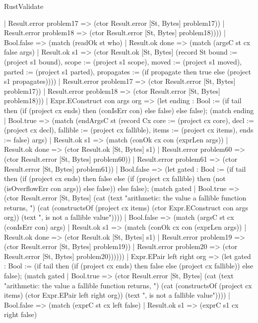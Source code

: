 \begin{lexlean}{RustValidate}
\begin{semanticmodule}
{            | Result.error problem17 => (ctor Result.error [St, Bytes] problem17))
          | Result.error problem18 => (ctor Result.error [St, Bytes] problem18))))
      | Bool.false => (match (readOk st who)
        | Result.ok done => (match (argsC st cx false args)
          | Result.ok s1 => (ctor Result.ok [St, Bytes] (record St {bound := (project s1 bound), scope := (project s1 scope), moved := (project s1 moved), parted := (project s1 parted), propagates := (if propagate then true else (project s1 propagates))}))
          | Result.error problem17 => (ctor Result.error [St, Bytes] problem17))
        | Result.error problem18 => (ctor Result.error [St, Bytes] problem18)))
    | Expr.EConstruct con args org => (let ending : Bool := (if tail then (if (project cx ends) then (conIsErr con) else false) else false); (match ending
      | Bool.true => (match (endArgsC st (record Cx {core := (project cx core), decl := (project cx decl), fallible := (project cx fallible), items := (project cx items), ends := false}) args)
        | Result.ok s1 => (match (conOk cx con (exprLen args))
          | Result.ok done => (ctor Result.ok [St, Bytes] s1)
          | Result.error problem60 => (ctor Result.error [St, Bytes] problem60))
        | Result.error problem61 => (ctor Result.error [St, Bytes] problem61))
      | Bool.false => (let gated : Bool := (if tail then (if (project cx ends) then false else (if (project cx fallible) then (not (isOverflowErr con args)) else false)) else false); (match gated
        | Bool.true => (ctor Result.error [St, Bytes] (cat (text "arithmetic: the value a fallible function returns, ") (cat (constructsOf (project cx items) (ctor Expr.EConstruct con args org)) (text ", is not a fallible value"))))
        | Bool.false => (match (argsC st cx (conIsErr con) args)
          | Result.ok s1 => (match (conOk cx con (exprLen args))
            | Result.ok done => (ctor Result.ok [St, Bytes] s1)
            | Result.error problem19 => (ctor Result.error [St, Bytes] problem19))
          | Result.error problem20 => (ctor Result.error [St, Bytes] problem20))))))
    | Expr.EPair left right org => (let gated : Bool := (if tail then (if (project cx ends) then false else (project cx fallible)) else false); (match gated
      | Bool.true => (ctor Result.error [St, Bytes] (cat (text "arithmetic: the value a fallible function returns, ") (cat (constructsOf (project cx items) (ctor Expr.EPair left right org)) (text ", is not a fallible value"))))
      | Bool.false => (match (exprC st cx left false)
        | Result.ok s1 => (exprC s1 cx right false)
}
\end{semanticmodule}
\end{lexlean}
